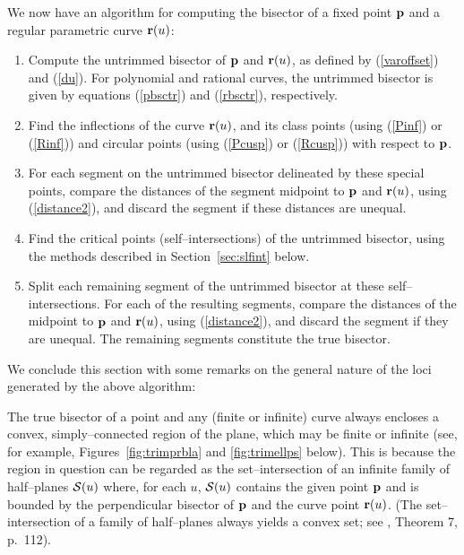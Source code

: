 We now have an algorithm for computing the bisector of a fixed point
${\bf p}$ and a regular parametric curve ${\bf r}(u)$:

\begin{enumerate}
\item
        Compute the untrimmed bisector of ${\bf p}$ and ${\bf r}(u)$, as
        defined by (\ref{varoffset}) and (\ref{du}). For polynomial and
        rational curves, the untrimmed bisector is given by equations
        (\ref{pbsctr}) and (\ref{rbsctr}), respectively.
\item
        Find the inflections of the curve ${\bf r}(u)$, and its class
        points (using (\ref{Pinf}) or (\ref{Rinf})) and circular points
        (using (\ref{Pcusp}) or (\ref{Rcusp})) with respect to ${\bf p}$.
\item
        For each segment on the untrimmed bisector delineated by these
        special points, compare the distances of the segment midpoint
        to ${\bf p}$ and ${\bf r}(u)$, using (\ref{distance2}), and
        discard the segment if these distances are unequal.
\item
        Find the critical points (self--intersections) of the untrimmed
        bisector, using the methods described in Section~\ref{sec:slfint}
        below.
\item
        Split each remaining segment of the untrimmed bisector at these
        self--intersections. For each of the resulting segments, compare
        the distances of the midpoint to ${\bf p}$ and ${\bf r}(u)$,
        using (\ref{distance2}), and discard the segment if they are
        unequal. The remaining segments constitute the true bisector.
\end{enumerate}

We conclude this section with some remarks on the general nature of
the loci generated by the above algorithm:

\begin{rmk}
{\rm
The true bisector of a point and any (finite or infinite) curve always
encloses a convex, simply--connected region of the plane, which may
be finite or infinite (see, for example, Figures~\ref{fig:trimprbla}
and \ref{fig:trimellps} below). This is because the region in question
can be regarded as the set--intersection of an infinite family of
half--planes ${\cal S}(u)$ where, for each $u$, ${\cal S}(u)$ contains
the given point ${\bf p}$ and is bounded by the perpendicular bisector
of ${\bf p}$ and the curve point ${\bf r}(u)$. (The set--intersection
of a family of half--planes always yields a convex set; see \cite
{kelly79}, Theorem 7, p.~112).
}
\end{rmk}

